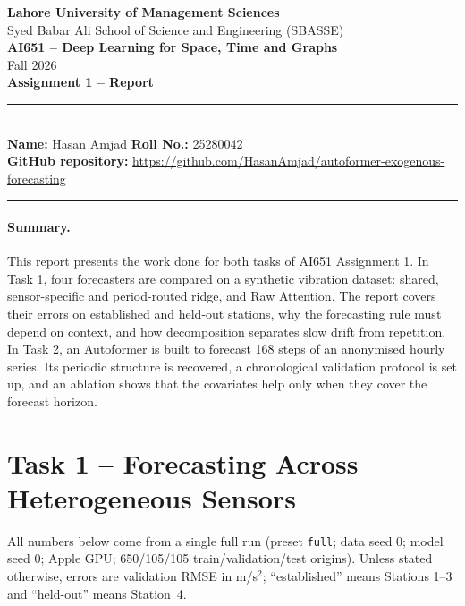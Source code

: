 \documentclass[11pt,a4paper]{article}
\begin{document}
\thispagestyle{empty}
\begin{center}
\textbf{Lahore University of Management Sciences}\\
Syed Babar Ali School of Science and Engineering (SBASSE)\\
\textbf{AI651 -- Deep Learning for Space, Time and Graphs}\\
Fall 2026\\[6pt]
\textbf{Assignment 1 -- Report}
\end{center}

\noindent\rule{\linewidth}{0.6pt}\\[2pt]
\textbf{Name:} Hasan Amjad \hfill \textbf{Roll No.:} 25280042\\[2pt]
\textbf{GitHub repository:} {\small\url{https://github.com/HasanAmjad/autoformer-exogenous-forecasting}}\\[-4pt]
\noindent\rule{\linewidth}{0.6pt}

\paragraph{Summary.} This report presents the work done for both tasks of AI651 Assignment 1. In Task 1, four forecasters are compared on a synthetic vibration dataset: shared, sensor-specific and period-routed ridge, and Raw Attention. The report covers their errors on established and held-out stations, why the forecasting rule must depend on context, and how decomposition separates slow drift from repetition. In Task 2, an Autoformer is built to forecast 168 steps of an anonymised hourly series. Its periodic structure is recovered, a chronological validation protocol is set up, and an ablation shows that the covariates help only when they cover the forecast horizon.

\section*{Task 1 -- Forecasting Across Heterogeneous Sensors}

\noindent All numbers below come from a single full run (preset \texttt{full}; data seed 0; model seed 0; Apple GPU; 650/105/105 train/validation/test origins). Unless stated otherwise, errors are validation RMSE in m/s$^2$; ``established'' means Stations 1--3 and ``held-out'' means Station~4.
\end{document}
